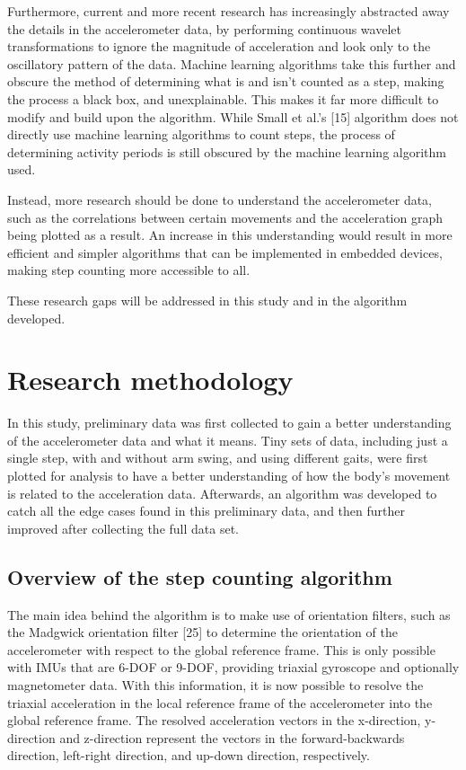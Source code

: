 \documentclass[12pt]{report}
\makeatletter
\newcommand{\cslcitation}[2]
 {\protect\hyper@linkstart{cite}{citeproc_bib_item_#1}#2\hyper@linkend}
\makeatother
\begin{document}
\clearpage

Furthermore, current and more recent research has
increasingly abstracted away the details in the accelerometer data,
by performing continuous wavelet
transformations to ignore the magnitude of acceleration and look
only to the oscillatory pattern of the data. Machine learning algorithms
take this further and obscure the method of determining what is and
isn't counted as a step, making the process a black box,
and unexplainable. This makes it far more difficult to modify
and build upon the algorithm.
While Small et al.'s \cslcitation{15}{[15]}
algorithm does not directly use machine learning algorithms to count
steps, the process of determining activity periods is still
obscured by the machine learning algorithm used.

Instead, more research should be done to understand the accelerometer
data, such as the correlations between certain movements and the
acceleration graph being plotted as a result. An increase in this
understanding would result in more efficient and simpler algorithms
that can be implemented in embedded devices, making step counting more
accessible to all.

These research gaps will be addressed in this study and
in the algorithm developed.
\chapter{Research methodology}
\label{sec:org3e3ac56}
\label{orga74852e}
In this study, preliminary data was first collected to gain a better
understanding of the accelerometer data and what it means.
Tiny sets of data, including just a single step,
with and without arm swing, and using different gaits, were
first plotted for analysis to have a better understanding of
how the body's movement is related to the acceleration data.
Afterwards, an algorithm was developed to catch all the edge
cases found in this preliminary data, and then further improved
after collecting the full data set.
\section{Overview of the step counting algorithm}
\label{sec:org5cce46e}
The main idea behind the algorithm is to make use of orientation
filters, such as the Madgwick orientation filter
\cslcitation{25}{[25]} to determine the orientation of
the accelerometer with respect to the global reference frame.
This is only possible with IMUs that are 6-DOF or 9-DOF,
providing triaxial gyroscope and optionally magnetometer data.
With this information, it is now possible to resolve the
triaxial acceleration in the local reference frame of the
accelerometer into the global reference frame.
The resolved acceleration vectors in the x-direction, y-direction
and z-direction represent the vectors in the forward-backwards direction,
left-right direction, and up-down direction, respectively.
\end{document}
